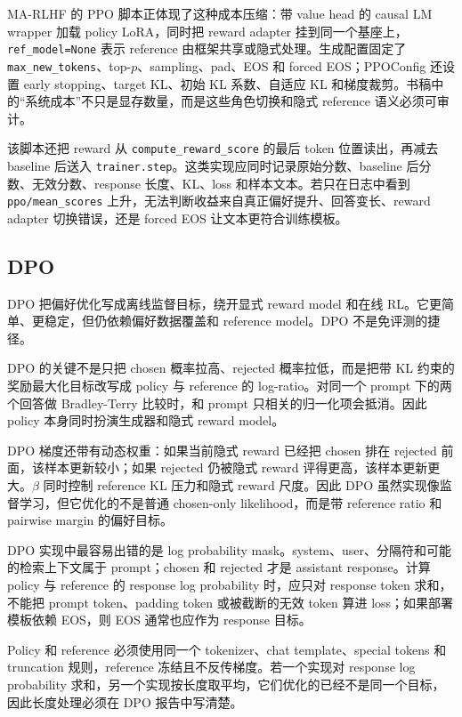 \documentclass[UTF8,zihao=-4,openany]{ctexbook}
\begin{document}
MA-RLHF 的 PPO 脚本正体现了这种成本压缩：带 value head 的 causal LM wrapper 加载 policy LoRA，同时把 reward adapter 挂到同一个基座上，\texttt{ref\_model=None} 表示 reference 由框架共享或隐式处理。生成配置固定了 \texttt{max\_new\_tokens}、top-$p$、sampling、pad、EOS 和 forced EOS；PPOConfig 还设置 early stopping、target KL、初始 KL 系数、自适应 KL 和梯度裁剪。书稿中的“系统成本”不只是显存数量，而是这些角色切换和隐式 reference 语义必须可审计。

该脚本还把 reward 从 \texttt{compute\_reward\_score} 的最后 token 位置读出，再减去 baseline 后送入 \texttt{trainer.step}。这类实现应同时记录原始分数、baseline 后分数、无效分数、response 长度、KL、loss 和样本文本。若只在日志中看到 \texttt{ppo/mean\_scores} 上升，无法判断收益来自真正偏好提升、回答变长、reward adapter 切换错误，还是 forced EOS 让文本更符合训练模板。

\subsection{DPO}
DPO 把偏好优化写成离线监督目标，绕开显式 reward model 和在线 RL。它更简单、更稳定，但仍依赖偏好数据覆盖和 reference model。DPO 不是免评测的捷径。

DPO 的关键不是只把 chosen 概率拉高、rejected 概率拉低，而是把带 KL 约束的奖励最大化目标改写成 policy 与 reference 的 log-ratio。对同一个 prompt 下的两个回答做 Bradley-Terry 比较时，和 prompt 只相关的归一化项会抵消。因此 policy 本身同时扮演生成器和隐式 reward model。

DPO 梯度还带有动态权重：如果当前隐式 reward 已经把 chosen 排在 rejected 前面，该样本更新较小；如果 rejected 仍被隐式 reward 评得更高，该样本更新更大。$\beta$ 同时控制 reference KL 压力和隐式 reward 尺度。因此 DPO 虽然实现像监督学习，但它优化的不是普通 chosen-only likelihood，而是带 reference ratio 和 pairwise margin 的偏好目标。

DPO 实现中最容易出错的是 log probability mask。system、user、分隔符和可能的检索上下文属于 prompt；chosen 和 rejected 才是 assistant response。计算 policy 与 reference 的 response log probability 时，应只对 response token 求和，不能把 prompt token、padding token 或被截断的无效 token 算进 loss；如果部署模板依赖 EOS，则 EOS 通常也应作为 response 目标。

Policy 和 reference 必须使用同一个 tokenizer、chat template、special tokens 和 truncation 规则，reference 冻结且不反传梯度。若一个实现对 response log probability 求和，另一个实现按长度取平均，它们优化的已经不是同一个目标，因此长度处理必须在 DPO 报告中写清楚。
\end{document}
